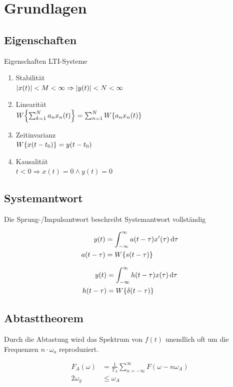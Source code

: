 \documentclass[10pt,a4paper]{article}
\begin{document}
\twocolumn
\pagestyle{fancy}
\section{Grundlagen}
  \subsection{Eigenschaften}
  Eigenschaften LTI-Systeme
  \begin{mdframed}[style=exercise]
    \begin{enumerate}
      \item Stabilität\\
      $\abs{x(t)} < M < \infty \Rightarrow \abs{y(t)} < N < \infty$
      \item Linearität\\
          $W\qty{\sum_{k=1}^{N}a_n x_n(t)}=\sum_{n=1}^{N}W\qty{a_n x_n(t)}$
      \item Zeitinvarianz\\
      $W\qty{x(t-t_0)} =y(t-t_0)$
      \item Kausalität\\
      $t < 0 \Rightarrow x(t)=0 \land y(t)=0$
    \end{enumerate}
  \end{mdframed}
  \subsection{Systemantwort}
  Die Sprung-/Impulsantwort beschreibt Systemantwort vollständig
  \begin{mdframed}[style=exercise]
    \begin{align}
      y(t) &= \int^{\infty}_{-\infty} a(t-\tau) x'(\tau) \dd{\tau}\\
      a(t-\tau) &= W\qty{s(t-\tau)}\nonumber
    \end{align}
  \end{mdframed}
  \begin{mdframed}[style=exercise]
    \begin{align}
      y(t) &= \int_{-\infty}^{\infty} h(t-\tau) x(\tau) \dd{\tau}\\
      h(t-\tau) &= W\qty{\delta(t-\tau)}\nonumber
    \end{align}
  \end{mdframed}
  \subsection{Abtasttheorem}
  Durch die Abtastung wird das Spektrum von $f(t)$ unendlich oft um die Frequenzen $n\cdot \omega_a$ reproduziert.
  \begin{mdframed}[style=exercise]
    \begin{align}
      F_A(\omega) &= \frac{1}{T_A} \sum_{n=-\infty}^{\infty} F(\omega-n\omega_A)\\
      2\omega_g &\leq \omega_A\nonumber
    \end{align}
  \end{mdframed}
\end{document}
